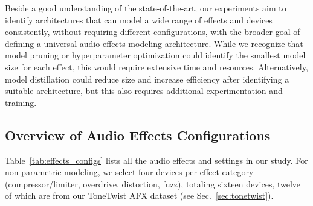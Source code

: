 Beside a good understanding of the state-of-the-art, our experiments aim to identify architectures that can model a wide range of effects and devices consistently, without requiring different configurations, with the broader goal of defining a universal audio effects modeling architecture.
While we recognize that model pruning \citep{sudholt2022pruning} or hyperparameter optimization could identify the smallest model size for each effect, this would require extensive time and resources. 
Alternatively, model distillation \citep{hinton2015distillingknowledgeneuralnetwork} could reduce size and increase efficiency after identifying a suitable architecture, but this also requires additional experimentation and training.

\subsection{Overview of Audio Effects Configurations}
Table~\ref{tab:effects_configs} lists all the audio effects and settings in our study. For non-parametric modeling, we select four devices per effect category (compressor/limiter, overdrive, distortion, fuzz), totaling sixteen devices, twelve of which are from our ToneTwist AFX dataset (see Sec.~\ref{sec:tonetwist}).


